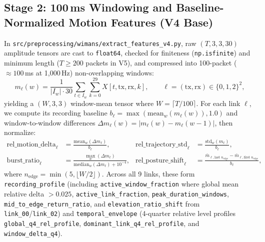 \documentclass[11pt,a4paper]{article}
\begin{document}
\subsection{Stage 2: 100\,ms Windowing and Baseline-Normalized Motion Features (V4 Base)}
In \texttt{src/preprocessing/wimans/extract\_features\_v4.py}, raw $(T, 3, 3, 30)$ amplitude tensors are cast to \texttt{float64}, checked for finiteness (\texttt{np.isfinite}) and minimum length ($T \ge 200$ packets in V5), and compressed into 100-packet ($\approx 100$\,ms at 1,000\,Hz) non-overlapping windows:
\begin{equation}
    m_{\ell}(w) = \frac{1}{|I_w| \cdot 30} \sum_{t \in I_w} \sum_{k=0}^{29} X[t, \text{tx}, \text{rx}, k], \qquad \ell = (\text{tx}, \text{rx}) \in \{0,1,2\}^2,
\end{equation}
yielding a $(W, 3, 3)$ window-mean tensor where $W = \lceil T / 100 \rceil$. For each link $\ell$, we compute its recording baseline $b_{\ell} = \max(\text{mean}_w(m_{\ell}(w)), 1.0)$ and window-to-window differences $\Delta m_{\ell}(w) = |m_{\ell}(w) - m_{\ell}(w-1)|$, then normalize:
\begin{align}
    \text{rel\_motion\_delta}_{\ell} &= \frac{\text{mean}_w(\Delta m_{\ell})}{b_{\ell}}, &
    \text{rel\_trajectory\_std}_{\ell} &= \frac{\text{std}_w(m_{\ell})}{b_{\ell}}, \\
    \text{burst\_ratio}_{\ell} &= \frac{\max_w(\Delta m_{\ell})}{\text{median}_w(\Delta m_{\ell}) + 10^{-4}}, &
    \text{rel\_posture\_shift}_{\ell} &= \frac{\bar{m}_{\ell,\text{last } n_{\text{edge}}} - \bar{m}_{\ell,\text{first } n_{\text{edge}}}}{b_{\ell}},
\end{align}
where $n_{\text{edge}} = \min(5, \lfloor W/2 \rfloor)$. Across all 9 links, these form \texttt{recording\_profile} (including \texttt{active\_window\_fraction} where global mean relative delta $> 0.025$, \texttt{active\_link\_fraction}, \texttt{peak\_duration\_windows}, \texttt{mid\_to\_edge\_return\_ratio}, and \texttt{elevation\_ratio\_shift} from \texttt{link\_00}/\texttt{link\_02}) and \texttt{temporal\_envelope} (4-quarter relative level profiles \texttt{global\_q4\_rel\_profile}, \texttt{dominant\_link\_q4\_rel\_profile}, and \texttt{window\_delta\_q4}).
\end{document}
